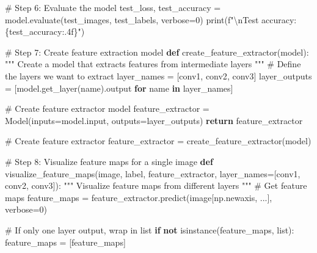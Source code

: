 \documentclass[
  letterpaper,
  DIV=11,
  numbers=noendperiod]{scrreprt}
\newenvironment{Shaded}{\begin{snugshade}}{\end{snugshade}}
\newcommand{\BuiltInTok}[1]{\textcolor[rgb]{0.00,0.23,0.31}{#1}}
\newcommand{\CharTok}[1]{\textcolor[rgb]{0.13,0.47,0.30}{#1}}
\newcommand{\CommentTok}[1]{\textcolor[rgb]{0.37,0.37,0.37}{#1}}
\newcommand{\ControlFlowTok}[1]{\textcolor[rgb]{0.00,0.23,0.31}{\textbf{#1}}}
\newcommand{\DecValTok}[1]{\textcolor[rgb]{0.68,0.00,0.00}{#1}}
\newcommand{\KeywordTok}[1]{\textcolor[rgb]{0.00,0.23,0.31}{\textbf{#1}}}
\newcommand{\NormalTok}[1]{\textcolor[rgb]{0.00,0.23,0.31}{#1}}
\newcommand{\OperatorTok}[1]{\textcolor[rgb]{0.37,0.37,0.37}{#1}}
\newcommand{\SpecialCharTok}[1]{\textcolor[rgb]{0.37,0.37,0.37}{#1}}
\newcommand{\SpecialStringTok}[1]{\textcolor[rgb]{0.13,0.47,0.30}{#1}}
\newcommand{\StringTok}[1]{\textcolor[rgb]{0.13,0.47,0.30}{#1}}
\begin{document}
\begin{Shaded}
\begin{Highlighting}[]
\CommentTok{\# Step 6: Evaluate the model}
\NormalTok{test\_loss, test\_accuracy }\OperatorTok{=}\NormalTok{ model.evaluate(test\_images, test\_labels, verbose}\OperatorTok{=}\DecValTok{0}\NormalTok{)}
\BuiltInTok{print}\NormalTok{(}\SpecialStringTok{f"}\CharTok{\textbackslash{}n}\SpecialStringTok{Test accuracy: }\SpecialCharTok{\{}\NormalTok{test\_accuracy}\SpecialCharTok{:.4f\}}\SpecialStringTok{"}\NormalTok{)}

\CommentTok{\# Step 7: Create feature extraction model}
\KeywordTok{def}\NormalTok{ create\_feature\_extractor(model):}
    \CommentTok{"""}
\CommentTok{    Create a model that extracts features from intermediate layers}
\CommentTok{    """}
    \CommentTok{\# Define the layers we want to extract}
\NormalTok{    layer\_names }\OperatorTok{=}\NormalTok{ [}\StringTok{\textquotesingle{}conv1\textquotesingle{}}\NormalTok{, }\StringTok{\textquotesingle{}conv2\textquotesingle{}}\NormalTok{, }\StringTok{\textquotesingle{}conv3\textquotesingle{}}\NormalTok{]}
\NormalTok{    layer\_outputs }\OperatorTok{=}\NormalTok{ [model.get\_layer(name).output }\ControlFlowTok{for}\NormalTok{ name }\KeywordTok{in}\NormalTok{ layer\_names]}
    
    \CommentTok{\# Create feature extractor model}
\NormalTok{    feature\_extractor }\OperatorTok{=}\NormalTok{ Model(inputs}\OperatorTok{=}\NormalTok{model.}\BuiltInTok{input}\NormalTok{, outputs}\OperatorTok{=}\NormalTok{layer\_outputs)}
    \ControlFlowTok{return}\NormalTok{ feature\_extractor}

\CommentTok{\# Create feature extractor}
\NormalTok{feature\_extractor }\OperatorTok{=}\NormalTok{ create\_feature\_extractor(model)}

\CommentTok{\# Step 8: Visualize feature maps for a single image}
\KeywordTok{def}\NormalTok{ visualize\_feature\_maps(image, label, feature\_extractor, layer\_names}\OperatorTok{=}\NormalTok{[}\StringTok{\textquotesingle{}conv1\textquotesingle{}}\NormalTok{, }\StringTok{\textquotesingle{}conv2\textquotesingle{}}\NormalTok{, }\StringTok{\textquotesingle{}conv3\textquotesingle{}}\NormalTok{]):}
    \CommentTok{"""}
\CommentTok{    Visualize feature maps from different layers}
\CommentTok{    """}
    \CommentTok{\# Get feature maps}
\NormalTok{    feature\_maps }\OperatorTok{=}\NormalTok{ feature\_extractor.predict(image[np.newaxis, ...], verbose}\OperatorTok{=}\DecValTok{0}\NormalTok{)}
    
    \CommentTok{\# If only one layer output, wrap in list}
    \ControlFlowTok{if} \KeywordTok{not} \BuiltInTok{isinstance}\NormalTok{(feature\_maps, }\BuiltInTok{list}\NormalTok{):}
\NormalTok{        feature\_maps }\OperatorTok{=}\NormalTok{ [feature\_maps]}
    

\end{Highlighting}
\end{Shaded}
\end{document}
